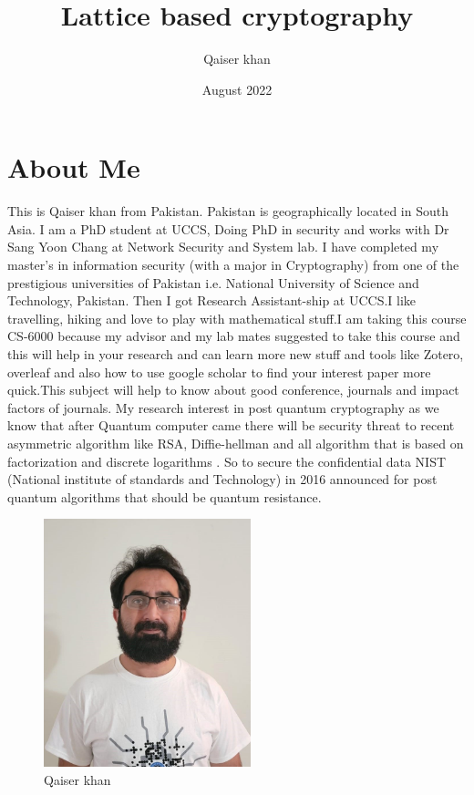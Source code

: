

\title{Lattice based cryptography}
\author{Qaiser khan }
\date{August 2022}


\maketitle

\section{About Me}
 This is Qaiser khan from Pakistan. Pakistan is geographically located in South Asia. I am a PhD student at UCCS, Doing PhD in security and works with Dr Sang Yoon Chang at Network Security and System lab.  I have completed my master’s in information security (with a major in Cryptography) from one of the prestigious universities of Pakistan i.e. National University of Science and Technology, Pakistan. Then I got Research Assistant-ship at UCCS.I like travelling, hiking and love to play with mathematical stuff.I am taking this course CS-6000 because my advisor and my lab mates suggested to take this course and this will help in your research and can learn more new stuff and tools like Zotero, overleaf and also how to use google scholar to find your interest paper more quick.This subject will help to know about good conference, journals and impact factors of journals. My research interest in post quantum cryptography as we know that after Quantum computer came there will be security threat to recent asymmetric algorithm like RSA, Diffie-hellman and all algorithm that is based on factorization and discrete logarithms \cite{alagic2019status}. So to secure the confidential data NIST (National institute of standards and Technology) in 2016 announced for post quantum algorithms that should be quantum resistance\cite{raavi2021security}.

\begin{figure}[htp]
    \centering
    \includegraphics[width=6cm]{qaiser.jpeg}
    \caption{Qaiser khan}
    \label{fig:Qaiser}
\end{figure}

